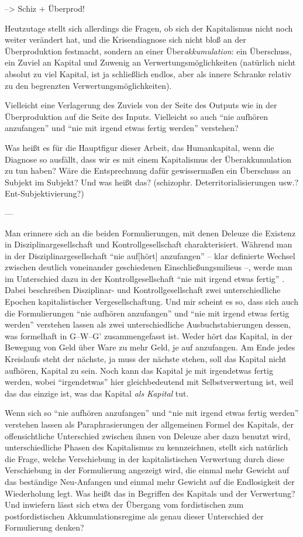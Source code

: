 \documentclass[12pt,
               DIV13,
               paper=a4,
               twoside=false,
               onehalfspacing,
               bibliography=totoc,
               toc=graduated,
               draft,
               ]{scrartcl}
\newcommand{\pc}[2]{\parencite[#1]{#2}}
\newcommand{\gwg}{G--W--G'\xspace}
\begin{document}
--> Schiz + Überprod!

Heutzutage stellt sich allerdings die Fragen, ob sich der Kapitalismus
nicht noch weiter verändert hat, und die Krisendiagnose sich nicht
bloß an der Überproduktion festmacht, sondern an einer
Über\emph{akkumulation}: ein Überschuss, ein Zuviel an Kapital und
Zuwenig an Verwertungsmöglichkeiten (natürlich nicht absolut zu viel
Kapital, ist ja schließlich endlos, aber als innere Schranke relativ
zu den begrenzten Verwertungsmöglichkeiten).

Vielleicht eine Verlagerung des Zuviels von der Seite des Outputs wie
in der Überproduktion auf die Seite des Inputs. Vielleicht so auch
"`nie aufhören anzufangen"' und "`nie mit irgend etwas fertig werden"'
verstehen?

Was heißt es für die Hauptfigur dieser Arbeit, das Humankapital, wenn
die Diagnose so ausfällt, dass wir es mit einem Kapitalismus der
Überakkumulation zu tun haben? Wäre die Entsprechnung dafür
gewissermaßen ein Überschuss an Subjekt im Subjekt? Und was heißt das?
(schizophr. Deterritorialisierungen usw.? Ent-Subjektivierung?)

---

Man erinnere sich an die beiden Formulierungen, mit denen Deleuze die
Existenz in Disziplinargesellschaft und Kontrollgesellschaft
charakterisiert. Während man in der Disziplinargesellschaft "`nie
auf[hört] anzufangen"' \pc{257}{ps} -- klar definierte Wechsel
zwischen deutlich voneinander geschiedenen Einschließungsmilieus --,
werde man im Unterschied dazu in der Kontrollgesellschaft "`nie mit
irgend etwas fertig"' \pc{257}{ps}. Dabei beschreiben Disziplinar- und
Kontrollgesellschaft zwei unterschiedliche Epochen kapitalistischer
Vergesellschaftung. Und mir scheint es so, dass sich auch die
Formulierungen "`nie aufhören anzufangen"' und "`nie mit irgend etwas
fertig werden"' verstehen lassen als zwei unterschiedliche
Ausbuchstabierungen dessen, was formelhaft in \gwg zusammengefasst
ist. Weder hört das Kapital, in der Bewegung von Geld über Ware zu
mehr Geld, je auf anzufangen. Am Ende jedes Kreislaufs steht der
nächste, ja muss der nächste stehen, soll das Kapital nicht aufhören,
Kapital zu sein. Noch kann das Kapital je mit irgendetwas fertig
werden, wobei "`irgendetwas"' hier gleichbedeutend mit
Selbstverwertung ist, weil das das einzige ist, was das Kapital
\emph{als Kapital} tut.

Wenn sich so "`nie aufhören anzufangen"' und "`nie mit irgend etwas
fertig werden"' verstehen lassen als Paraphrasierungen der allgemeinen
Formel des Kapitals, der offensichtliche Unterschied zwischen ihnen
von Deleuze aber dazu benutzt wird, unterschiedliche Phasen des
Kapitalismus zu kennzeichnen, stellt sich natürlich die Frage, welche
Verschiebung in der kapitalistischen Verwertung durch diese
Verschiebung in der Formulierung angezeigt wird, die einmal mehr
Gewicht auf das beständige Neu-Anfangen und einmal mehr Gewicht auf
die Endlosigkeit der Wiederholung legt. Was heißt das in Begriffen des
Kapitals und der Verwertung? Und inwiefern lässt sich etwa der
Übergang vom fordistischen zum postfordistischen Akkumulationsregime
als genau dieser Unterschied der Formulierung denken?
\end{document}
